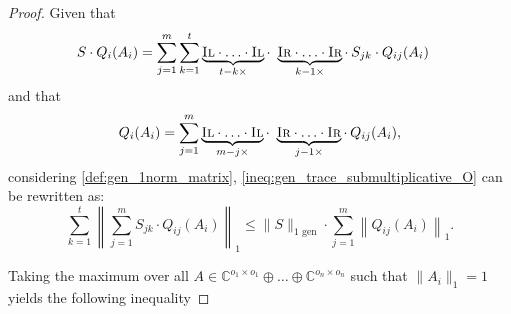 \begin{proof}
Given that
\begin{equation}
\begin{split} 
  S \cdot Q_i (A_i) & =  \sum_{j=1}^{m} \sum_{k=1}^{t} \underbrace{\textsc{Il} \cdot \ldots \cdot \textsc{Il}}_{t-k \times} \cdot  \underbrace{\textsc{Ir} \cdot \ldots \cdot \textsc{Ir}}_{k-1 \times} \cdot \hspace{2pt} S_{jk} \cdot Q_{ij}(A_i)
\end{split}
\end{equation}
and that
\begin{equation}
  \begin{split}
     Q_i (A_i) =  \sum_{j=1}^{m} \underbrace{\textsc{Il} \cdot \ldots \cdot \textsc{Il}}_{m-j \times} \cdot  \underbrace{\textsc{Ir} \cdot \ldots \cdot \textsc{Ir}}_{j-1 \times} \cdot \hspace{2pt} Q_{ij}(A_i),
  \end{split}
\end{equation}
considering \autoref{def:gen_1norm_matrix},    \autoref{ineq:gen_trace_submultiplicative_O} can be rewritten as:
\begin{equation}
    \sum_{k=1}^{t} \left\| \sum_{j=1}^{m} S_{jk} \cdot Q_{ij} (A_i) \right\|_{1}  \leq \lVert S  \rVert_{1 \text{ gen}} \cdot \sum_{j=1}^{m} \left\|  Q_{ij} (A_i) \right\|_{1}.
\end{equation}

Taking the maximum over all $A \in \mathbb{C}^{o_1 \times o_1} \oplus \ldots \oplus \mathbb{C}^{o_n \times o_n}$ such that $\lVert A_i \rVert_{1} = 1$ yields the following inequality 



\end{proof}
